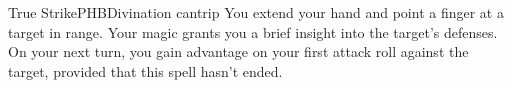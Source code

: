 \begin{spell}{True Strike}{PHB}{Divination cantrip}
{
}
You extend your hand and point a finger at a target in range.
Your magic grants you a brief insight into the target's
defenses. On your next turn, you gain advantage on your first
attack roll against the target, provided that this spell
hasn't ended.
\end{spell}
